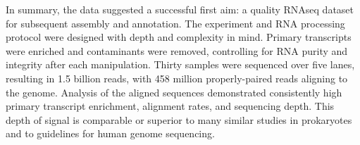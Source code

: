 In summary, the data suggested a successful first aim: a quality RNAseq dataset for subsequent assembly and annotation. The experiment and RNA processing protocol were designed with depth and complexity in mind. Primary transcripts were enriched and contaminants were removed, controlling for RNA purity and integrity after each manipulation. Thirty samples were sequenced over five lanes, resulting in 1.5 billion reads, with 458 million properly-paired reads aligning to the genome. Analysis of the aligned sequences demonstrated consistently high primary transcript enrichment, alignment rates, and sequencing depth. This depth of signal is comparable or superior to many similar studies in prokaryotes and to guidelines for human genome sequencing.



